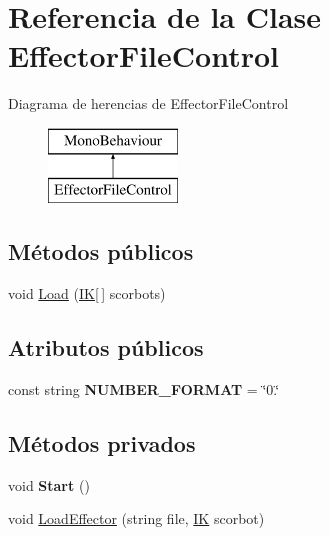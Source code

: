 \hypertarget{class_effector_file_control}{}\section{Referencia de la Clase Effector\+File\+Control}
\label{class_effector_file_control}
Diagrama de herencias de Effector\+File\+Control\begin{figure}[H]
\begin{center}
\leavevmode
\includegraphics[height=2.000000cm]{class_effector_file_control}
\end{center}
\end{figure}
\subsection*{Métodos públicos}
\begin{DoxyCompactItemize}
\item 
void \mbox{\hyperlink{class_effector_file_control_a1239eff6ba957cbd61db6eaf072d60d2}{Load}} (\mbox{\hyperlink{class_i_k}{IK}}\mbox{[}$\,$\mbox{]} scorbots)
\end{DoxyCompactItemize}
\subsection*{Atributos públicos}
\begin{DoxyCompactItemize}
\item 
\mbox{\label{class_effector_file_control_a55a3c275d2dbe12f323b2c544ef01bed}} 
const string {\bfseries N\+U\+M\+B\+E\+R\+\_\+\+F\+O\+R\+M\+AT} = \char`\"{}0.\char`\"{}
\end{DoxyCompactItemize}
\subsection*{Métodos privados}
\begin{DoxyCompactItemize}
\item 
\mbox{\label{class_effector_file_control_a7293b58015928c7aa553d570760bdf01}} 
void {\bfseries Start} ()
\item 
void \mbox{\hyperlink{class_effector_file_control_ab74d54146539af59f39130f83376d5b3}{Load\+Effector}} (string file, \mbox{\hyperlink{class_i_k}{IK}} scorbot)
\end{DoxyCompactItemize}

